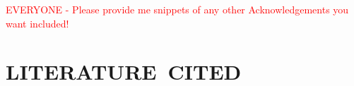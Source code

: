\documentclass[letterpaper]{ar-1col}
\newcommand{\textred}[1]{\textcolor{red}{ #1}}
\begin{document}
\textred{EVERYONE - Please provide me snippets of any other Acknowledgements you want included!}

%
\section*{LITERATURE\ CITED}








 

\end{document}
